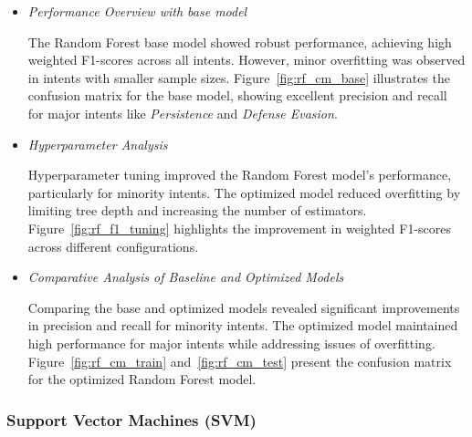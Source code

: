             \begin{itemize}
        
                \item \textit{Performance Overview with base model}
                
                    \vspace{0.3em}

                    The Random Forest base model showed robust performance, achieving high weighted F1-scores across all intents. However, minor overfitting was observed in intents with smaller sample sizes. Figure~\ref{fig:rf_cm_base} illustrates the confusion matrix for the base model, showing excellent precision and recall for major intents like \textit{Persistence} and \textit{Defense Evasion}.

                \vspace{0.5em}

                \item \textit{Hyperparameter Analysis}
                
                    \vspace{0.3em}

                    Hyperparameter tuning improved the Random Forest model's performance, particularly for minority intents. The optimized model reduced overfitting by limiting tree depth and increasing the number of estimators. Figure~\ref{fig:rf_f1_tuning} highlights the improvement in weighted F1-scores across different configurations.

                \vspace{0.5em}

                \item \textit{Comparative Analysis of Baseline and Optimized Models}
                
                    \vspace{0.3em}

                    Comparing the base and optimized models revealed significant improvements in precision and recall for minority intents. The optimized model maintained high performance for major intents while addressing issues of overfitting. Figure~\ref{fig:rf_cm_train} and~\ref{fig:rf_cm_test} present the confusion matrix for the optimized Random Forest model.
                
            \end{itemize}

        \subsubsection{Support Vector Machines (SVM)}
        
